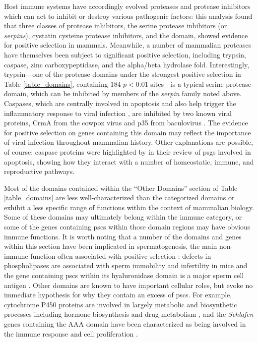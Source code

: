 Host immune systems have accordingly evolved proteases and protease
inhibitors which can act to inhibit or destroy various pathogenic
factors: this analysis found that three classes of protease
inhibitors, the serine protease inhibitors (or \emph{serpins}),
cystatin cysteine protease inhibitors, and the \amac domain, showed
evidence for positive selection in mammals. Meanwhile, a number of
mammalian proteases have themselves been subject to significant
positive selection, including trypsin, caspase, zinc carboxypeptidase,
and the alpha/beta hydrolase fold. Interestingly, trypsin---one of the
protease domains under the strongest positive selection in Table
\ref{table_domains}, containing 184 $p<0.01$ sites---is a typical
serine protease domain, which can be inhibited by members of the
\emph{serpin} family noted above. Caspases, which are centrally
involved in apoptosis and also help trigger the inflammatory response
to viral infection \citep{Nicholson1997}, are inhibited by two known
viral proteins, CrmA from the cowpox virus and p35 from baculovirus
\citep{Villa1997}. The evidence for positive selection on genes
containing this domain may reflect the importance of viral infection
throughout mammalian history. Other explanations are possible, of
course; caspase proteins were highlighted by \citet{Fonseca2010} in
their review of \acp{psg} involved in apoptosis, showing how they
interact with a number of homeostatic, immune, and reproductive
pathways.

Most of the domains contained within the ``Other Domains'' section of
Table \ref{table_domains} are less well-characterized than the
categorized domains or exhibit a less specific range of functions
within the context of mammalian biology. Some of these domains may
ultimately belong within the immune category, or some of the genes
containing \acp{psc} within those domain regions may have obvious
immune functions. It is worth noting that a number of the domains and
genes within this section have been implicated in spermatogenesis, the
main non-immune function often associated with positive selection
\citep{Wyckoff2000,Torgerson2002,Nielsen2005}: defects in
phospholipases are associated with sperm immobility and infertility in
mice \citep{Murakami2010,Sato2010} and the  gene
containing \acp{psc} within its hyaluronidase domain is a major sperm
cell antigen \citep{MartinDeLeon2006}. Other domains are known to have
important cellular roles, but evoke no immediate hypothesis for why
they contain an excess of \acp{psc}. For example, cytochrome P450
proteins are involved in largely metabolic and biosynthetic processes
including hormone biosynthesis and drug metabolism
\citep{WerckReichhart2000}, and the \emph{Schlafen} genes containing
the AAA domain have been characterized as being involved in the immune
response and cell proliferation \citep{Bustos2009}.


